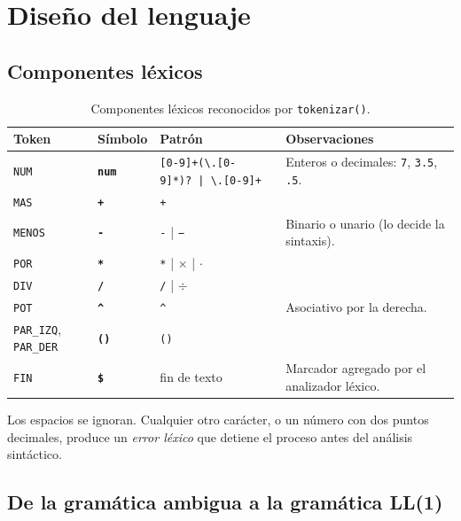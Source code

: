 \documentclass[11pt,a4paper]{article}
\newcommand{\tm}[1]{\textcolor{tmcolor}{\texttt{\textbf{#1}}}}
\begin{document}
\section{Diseño del lenguaje}

\subsection{Componentes léxicos}

\begin{table}[H]
\centering
\caption{Componentes léxicos reconocidos por \texttt{tokenizar()}.}
\label{tab:tokens}
\begin{tabular}{l l >{\small}l L{4.6cm}}
\toprule
{}\textbf{Token} & \textbf{Símbolo} & \textbf{Patrón} & \textbf{Observaciones} \\
\midrule
\texttt{NUM}     & \tm{num} & \texttt{[0-9]+(\textbackslash.[0-9]*)?\,|\,\textbackslash.[0-9]+} & Enteros o decimales: \texttt{7}, \texttt{3.5}, \texttt{.5}. \\
\texttt{MAS}     & \tm{+}   & \texttt{+}       & \\
\texttt{MENOS}   & \tm{-}   & \texttt{-} \;|\; \texttt{−} & Binario o unario (lo decide la sintaxis). \\
\texttt{POR}     & \tm{*}   & \texttt{*} \;|\; $\times$ \;|\; $\cdot$ & \\
\texttt{DIV}     & \tm{/}   & \texttt{/} \;|\; $\div$ & \\
\texttt{POT}     & \tm{\^{}} & \texttt{\^{}}   & Asociativo por la derecha. \\
\texttt{PAR\_IZQ}, \texttt{PAR\_DER} & \tm{(}\;\tm{)} & \texttt{(}\;\texttt{)} & \\
\texttt{FIN}     & \tm{\$}  & fin de texto     & Marcador agregado por el analizador léxico. \\
\bottomrule
\end{tabular}
\end{table}

Los espacios se ignoran. Cualquier otro carácter, o un número con dos puntos decimales, produce un
\emph{error léxico} que detiene el proceso antes del análisis sintáctico.

\subsection{De la gramática ambigua a la gramática LL(1)}
\end{document}
